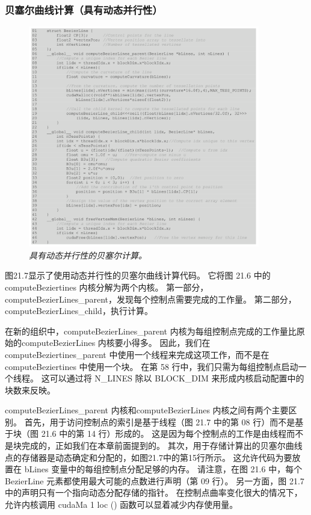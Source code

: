\subsubsection{贝塞尔曲线计算（具有动态并行性）}
\begin{figure}[H]
	\centering
	\includegraphics[width=0.9\textwidth]{figs/F21.7.png}
	\caption{\textit{具有动态并行性的贝塞尔计算。}}
\end{figure}

图21.7显示了使用动态并行性的贝塞尔曲线计算代码。 它将图 21.6 中的computeBeziertines 内核分解为两个内核。 
第一部分，computeBezierLines\_parent，发现每个控制点需要完成的工作量。 
第二部分，computeBezierLines\_child，执行计算。

在新的组织中，computeBezierLines\_parent 内核为每组控制点完成的工作量比原始的computeBezierLines 内核要小得多。 
因此，我们在computeBeziertines\_parent 中使用一个线程来完成这项工作，而不是在computeBeziertines 中使用一个块。 
在第 58 行中，我们只需为每组控制点启动一个线程。 
这可以通过将 N\_LINES 除以 BLOCK\_DIM 来形成内核启动配置中的块数来反映。

computeBezierLines\_parent 内核和computeBezierLines 内核之间有两个主要区别。 
首先，用于访问控制点的索引是基于线程（图 21.7 中的第 08 行）而不是基于块（图 21.6 中的第 14 行）形成的。 
这是因为每个控制点的工作是由线程而不是块完成的，正如我们在本章前面提到的。 
其次，用于存储计算出的贝塞尔曲线点的存储器是动态确定和分配的，如图21.7中的第15行所示。 
这允许代码为要放置在 bLines 变量中的每组控制点分配足够的内存。 
请注意，在图 21.6 中，每个 BezierLine 元素都使用最大可能的点数进行声明（第 09 行）。 
另一方面，图 21.7 中的声明只有一个指向动态分配存储的指针。 
在控制点曲率变化很大的情况下，允许内核调用 cudaMa 1 loc () 函数可以显着减少内存使用量。

